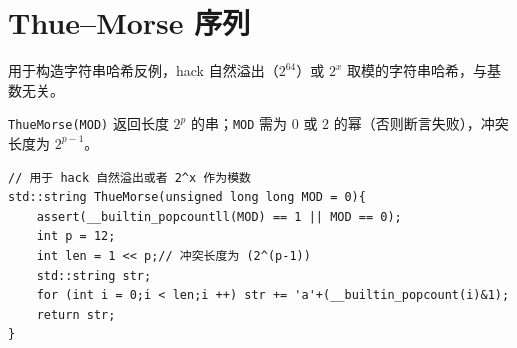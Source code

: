 \section{Thue–Morse 序列}

用于构造字符串哈希反例，hack 自然溢出（$2^{64}$）或 $2^x$ 取模的字符串哈希，与基数无关。

\texttt{ThueMorse(MOD)} 返回长度 $2^p$ 的串；\texttt{MOD} 需为 $0$ 或 $2$ 的幂（否则断言失败），冲突长度为 $2^{p-1}$。

\begin{lstlisting}
// 用于 hack 自然溢出或者 2^x 作为模数
std::string ThueMorse(unsigned long long MOD = 0){
    assert(__builtin_popcountll(MOD) == 1 || MOD == 0);
    int p = 12;
    int len = 1 << p;// 冲突长度为 (2^(p-1))
    std::string str;
    for (int i = 0;i < len;i ++) str += 'a'+(__builtin_popcount(i)&1);
    return str;
}
\end{lstlisting}
